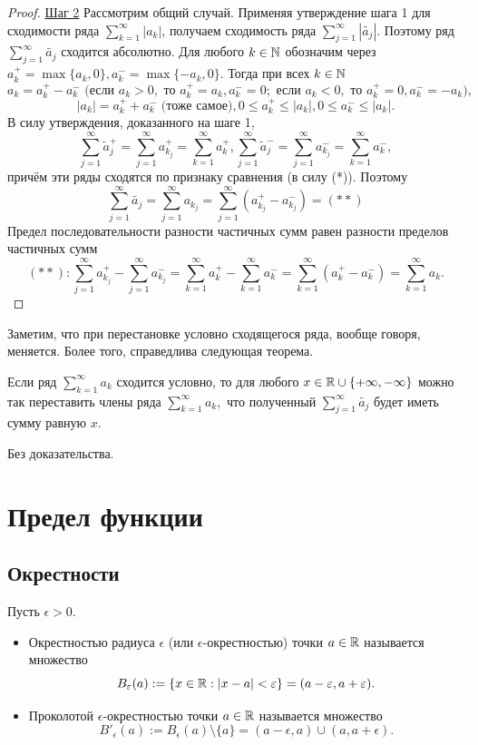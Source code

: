 \begin{proof}
		\underline{Шаг 2} Рассмотрим общий случай. Применяя утверждение шага 1 для сходимости ряда $\sum^{\infty}_{k = 1} |a_k|$, получаем сходимость ряда $\sum^{\infty}_{j = 1} |\tilde{a_j}|$. Поэтому ряд $\sum^{\infty}_{j = 1} \tilde{a_j}$  сходится абсолютно. Для любого $k \in \mathbb N$ обозначим через $a^+_k = \max\{a_k, 0\}, a^-_k = \max\{-a_k, 0\}.$ Тогда при всех $k \in \mathbb N$
		\[ a_k = a^+_k - a^-_k \text{ (если } a_k > 0, \text{ то } a^+_k = a_k, a^-_k = 0; \text{ если } a_k < 0, \text{ то } a^+_k = 0, a^-_k = -a_k), \]
		\[ |a_k| = a^+_k + a^-_k \text{ (тоже самое)}, 0 \leqslant a^+_k \leqslant |a_k|, 0 \leqslant a^-_k \leqslant |a_k|. \]
		В силу утверждения, доказанного на шаге 1,
		\[ \sum^{\infty}_{j = 1} \tilde{a}^+_j = \sum^{\infty}_{j = 1} a^+_{k_j} =  \sum^{\infty}_{k = 1} a^+_k, \sum^{\infty}_{j = 1} \tilde{a}^-_j = \sum^{\infty}_{j = 1} a^-_{k_j} =  \sum^{\infty}_{k = 1} a^-_k, \]
		причём эти ряды сходятся по признаку сравнения (в силу (*)). Поэтому
		\[ \sum^{\infty}_{j = 1} \tilde{a_j} = \sum^{\infty}_{j = 1} a_{k_j} = \sum^{\infty}_{j = 1} (a^+_{k_j} - a^-_{k_j}) = (**) \]
		Предел последовательности разности частичных сумм равен разности пределов частичных сумм
		\[ (**): \sum^{\infty}_{j = 1} a^+_{k_j} - \sum^{\infty}_{j = 1} a^-_{k_j} = \sum^{\infty}_{k = 1} a^+_k - \sum^{\infty}_{k = 1} a^-_k = \sum^{\infty}_{k = 1} (a^+_k - a^-_k) = \sum^{\infty}_{k = 1} a_k. \]
	\end{proof}
	
	Заметим, что при перестановке условно сходящегося ряда, вообще говоря, меняется. Более того, справедлива следующая теорема.
	
	\begin{theorem}
		Если ряд $\sum^{\infty}_{k = 1} a_k$ сходится условно, то для любого $x \in \mathbb R \cup \{+\infty, -\infty\}$ можно так переставить члены ряда $\sum^{\infty}_{k = 1} a_k,$ что полученный $\sum^{\infty}_{j = 1} \tilde{a_j}$ будет иметь сумму равную $x$.
	\end{theorem}
	
	Без доказательства.
	
	\chapter{Предел функции}
	
	\section{Окрестности}
	
	\begin{definition}
		Пусть $\epsilon > 0$.
		\begin{itemize}
			\item Окрестностью радиуса $\epsilon$ (или $\epsilon$-окрестностью) точки
			$a \in \mathbb R$ называется множество
			\[ B_{\varepsilon}(a) := \{x \in \mathbb R : |x - a| < \varepsilon\} = (a - \varepsilon, a + \varepsilon). \]
			\item Проколотой $\epsilon$-окрестностью точки $a \in \mathbb R$ называется
			множество
			\[ B'_{\epsilon}(a) := B_{\epsilon}(a) \setminus \{a\} = (a - \epsilon, a) \cup (a, a + \epsilon). \]
		\end{itemize}
	\end{definition}
	
